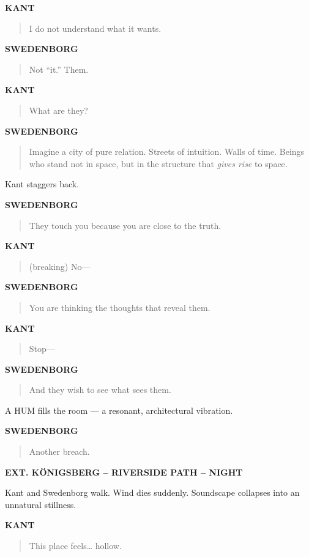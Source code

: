 \documentclass[12pt]{article}
\newcommand{\Scene}[1]{\vspace{1.2em}\textbf{#1}\vspace{0.8em}}
\newcommand{\Character}[1]{\vspace{0.8em}\textbf{#1}\vspace{0.4em}}
\newenvironment{Dialogue}{\begin{quote}\begin{RaggedRight}}{\end{RaggedRight}\end{quote}}
\newcommand{\Action}[1]{\vspace{0.4em}#1\vspace{0.4em}}
\begin{document}
\Character{KANT}
\begin{Dialogue}
I do not understand what it wants.
\end{Dialogue}

\Character{SWEDENBORG}
\begin{Dialogue}
Not “it.”  
Them.
\end{Dialogue}

\Character{KANT}
\begin{Dialogue}
What are they?
\end{Dialogue}

\Character{SWEDENBORG}
\begin{Dialogue}
Imagine a city of pure relation.  
Streets of intuition.  
Walls of time.  
Beings who stand not in space,  
but in the structure that \textit{gives rise} to space.
\end{Dialogue}

\Action{Kant staggers back.}

\Character{SWEDENBORG}
\begin{Dialogue}
They touch you because you are close to the truth.
\end{Dialogue}

\Character{KANT}
\begin{Dialogue}
(breaking)  
No—
\end{Dialogue}

\Character{SWEDENBORG}
\begin{Dialogue}
You are thinking the thoughts that reveal them.
\end{Dialogue}

\Character{KANT}
\begin{Dialogue}
Stop—
\end{Dialogue}

\Character{SWEDENBORG}
\begin{Dialogue}
And they wish to see what sees them.
\end{Dialogue}

\Action{A HUM fills the room — a resonant, architectural vibration.}

\Character{SWEDENBORG}
\begin{Dialogue}
Another breach.
\end{Dialogue}

\Scene{EXT. KÖNIGSBERG – RIVERSIDE PATH – NIGHT}

\Action{Kant and Swedenborg walk.  
Wind dies suddenly.  
Soundscape collapses into an unnatural stillness.}

\Character{KANT}
\begin{Dialogue}
This place feels… hollow.
\end{Dialogue}
\end{document}
